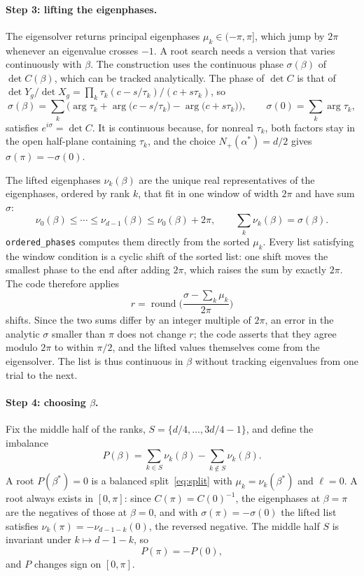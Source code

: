\documentclass[11pt]{article}
\begin{document}
\paragraph{Step 3: lifting the eigenphases.} The eigensolver returns principal eigenphases
$\mu_k\in(-\pi,\pi]$, which jump by $2\pi$ whenever an eigenvalue crosses $-1$. A root search
needs a version that varies continuously with $\beta$. The construction uses the continuous
phase $\sigma(\beta)$ of $\det C(\beta)$, which can be tracked analytically. The phase of
$\det C$ is that of $\det Y_g/\det X_g=\prod_k\tau_k(c-s/\tau_k)/(c+s\tau_k)$, so
\begin{equation}\label{eq:sigma}
\sigma(\beta)=\sum_k\Big(\arg\tau_k+\arg\big(c-s/\tau_k\big)-\arg\big(c+s\tau_k\big)\Big),
\qquad \sigma(0)=\sum_k\arg\tau_k,
\end{equation}
satisfies $e^{i\sigma}=\det C$. It is continuous because, for nonreal $\tau_k$, both factors stay
in the open half-plane containing $\tau_k$, and the choice $N_+(\alpha^\ast)=d/2$ gives
$\sigma(\pi)=-\sigma(0)$.

The lifted eigenphases $\nu_k(\beta)$ are the unique real representatives of the eigenphases,
ordered by rank $k$, that fit in one window of width $2\pi$ and have sum $\sigma$:
\begin{equation}\label{eq:nu}
\nu_0(\beta)\le\cdots\le\nu_{d-1}(\beta)\le\nu_0(\beta)+2\pi,\qquad
\sum_k\nu_k(\beta)=\sigma(\beta).
\end{equation}
\texttt{ordered\_phases} computes them directly from the sorted $\mu_k$. Every list satisfying the
window condition is a cyclic shift of the sorted list: one shift moves the smallest phase to the
end after adding $2\pi$, which raises the sum by exactly $2\pi$. The code therefore applies
\[
r=\operatorname{round}\Big(\frac{\sigma-\sum_k\mu_k}{2\pi}\Big)
\]
shifts. Since the two sums differ by an integer multiple of $2\pi$, an error in the analytic
$\sigma$ smaller than $\pi$ does not change $r$; the code asserts that they agree modulo $2\pi$ to
within $\pi/2$, and the lifted values themselves come from the eigensolver. The list is thus
continuous in $\beta$ without tracking eigenvalues from one trial to the next.

\paragraph{Step 4: choosing $\beta$.} Fix the middle half of the ranks,
$S=\{d/4,\dots,3d/4-1\}$, and define the imbalance
\begin{equation}\label{eq:P}
P(\beta)=\sum_{k\in S}\nu_k(\beta)-\sum_{k\notin S}\nu_k(\beta).
\end{equation}
A root $P(\beta^\ast)=0$ is a balanced split~\eqref{eq:split} with $\mu_k=\nu_k(\beta^\ast)$ and
$\ell=0$. A root always exists in $[0,\pi]$: since $C(\pi)=C(0)^{-1}$, the eigenphases at
$\beta=\pi$ are the negatives of those at $\beta=0$, and with $\sigma(\pi)=-\sigma(0)$ the lifted
list satisfies $\nu_k(\pi)=-\nu_{d-1-k}(0)$, the reversed negative. The middle half $S$ is
invariant under $k\mapsto d-1-k$, so
\begin{equation}\label{eq:sign}
P(\pi)=-P(0),
\end{equation}
and $P$ changes sign on $[0,\pi]$.
\end{document}
